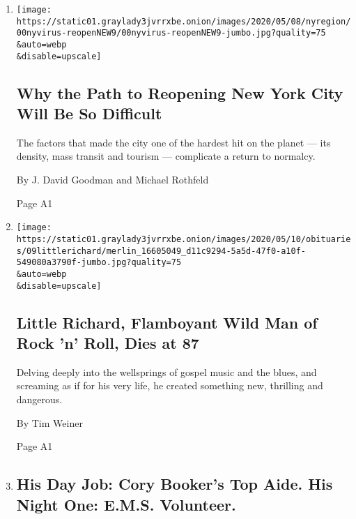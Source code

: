 \begin{enumerate}
\def\labelenumi{\arabic{enumi}.}
\item
  \href{/2020/05/10/nyregion/reopen-coronavirus-nyc-testing.html}{}

  \texttt{[image: https://static01.graylady3jvrrxbe.onion/images/2020/05/08/nyregion/00nyvirus-reopenNEW9/00nyvirus-reopenNEW9-jumbo.jpg?quality=75\\\&auto=webp\\\&disable=upscale]}

  \hypertarget{why-the-path-to-reopening-new-york-city-will-be-so-difficult}{%
  \subsection{Why the Path to Reopening New York City Will Be So
  Difficult}\label{why-the-path-to-reopening-new-york-city-will-be-so-difficult}}

  The factors that made the city one of the hardest hit on the planet
  --- its density, mass transit and tourism --- complicate a return to
  normalcy.

  By J. David Goodman and Michael Rothfeld

  Page A1
\item
  \href{/2020/05/09/arts/music/little-richard-dead.html}{}

  \texttt{[image: https://static01.graylady3jvrrxbe.onion/images/2020/05/10/obituaries/09littlerichard/merlin\_16605049\_d11c9294-5a5d-47f0-a10f-549080a3790f-jumbo.jpg?quality=75\\\&auto=webp\\\&disable=upscale]}

  \hypertarget{little-richard-flamboyant-wild-man-of-rock-n-roll-dies-at-87}{%
  \subsection{Little Richard, Flamboyant Wild Man of Rock 'n' Roll, Dies
  at
  87}\label{little-richard-flamboyant-wild-man-of-rock-n-roll-dies-at-87}}

  Delving deeply into the wellsprings of gospel music and the blues, and
  screaming as if for his very life, he created something new, thrilling
  and dangerous.

  By Tim Weiner

  Page A1
\item
  \href{/2020/05/07/us/politics/coronavirus-new-jersey.html}{}

  \hypertarget{his-day-job-cory-bookers-top-aide-his-night-one-ems-volunteer}{%
  \subsection{His Day Job: Cory Booker's Top Aide. His Night One: E.M.S.
  Volunteer.}\label{his-day-job-cory-bookers-top-aide-his-night-one-ems-volunteer}}


\end{enumerate}
